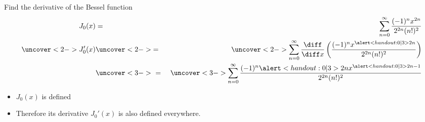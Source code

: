 \begin{frame}
\begin{example} %
Find the derivative of the Bessel function
\abovedisplayskip=0pt
\belowdisplayskip=0pt
\begin{eqnarray*}
J_0(x) & = & \sum_{n=0}^\infty \frac{(-1)^n x^{2n}}{2^{2n}(n!)^2}\\%
\uncover<2->{%
J_0'(x)%
}%
 & \uncover<2->{ = } &%
\uncover<2->{%
\sum_{n=0}^\infty \frac{\diff}{\diff x}\left( \frac{(-1)^n x^{\alert<handout:0| 3>{ 2n}}}{2^{2n}(n!)^2}\right) %
}\\%
 & \uncover<3->{\  = \ } &%
\uncover<3->{%
\sum_{n=0}^\infty \frac{(-1)^n \alert<handout:0| 3>{2n}x^{\alert<handout:0| 3>{ 2n -1}}}{2^{2n}(n!)^2}%
}%
\end{eqnarray*}
\begin{itemize}
\item<4-| alert@4-5>  $J_0(x)$ is defined 
\item<6->  Therefore its derivative $J_0'(x)$ is also defined everywhere.
\end{itemize}
\end{example}
\end{frame}
